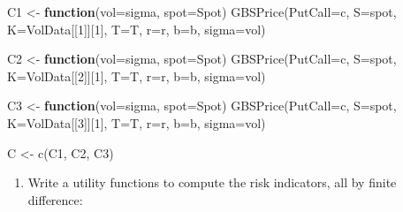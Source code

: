 \documentclass[
]{article}
\newenvironment{Shaded}{\begin{snugshade}}{\end{snugshade}}
\newcommand{\AttributeTok}[1]{\textcolor[rgb]{0.77,0.63,0.00}{#1}}
\newcommand{\ControlFlowTok}[1]{\textcolor[rgb]{0.13,0.29,0.53}{\textbf{#1}}}
\newcommand{\DecValTok}[1]{\textcolor[rgb]{0.00,0.00,0.81}{#1}}
\newcommand{\FunctionTok}[1]{\textcolor[rgb]{0.00,0.00,0.00}{#1}}
\newcommand{\NormalTok}[1]{#1}
\newcommand{\OtherTok}[1]{\textcolor[rgb]{0.56,0.35,0.01}{#1}}
\newcommand{\StringTok}[1]{\textcolor[rgb]{0.31,0.60,0.02}{#1}}
\providecommand{\tightlist}{%
  \setlength{\itemsep}{0pt}\setlength{\parskip}{0pt}}
\begin{document}
\begin{Shaded}
\begin{Highlighting}[]
\NormalTok{C1 }\OtherTok{\textless{}{-}} \ControlFlowTok{function}\NormalTok{(}\AttributeTok{vol=}\NormalTok{sigma, }\AttributeTok{spot=}\NormalTok{Spot) }\FunctionTok{GBSPrice}\NormalTok{(}\AttributeTok{PutCall=}\StringTok{\textquotesingle{}c\textquotesingle{}}\NormalTok{, }\AttributeTok{S=}\NormalTok{spot, }\AttributeTok{K=}\NormalTok{VolData[[}\DecValTok{1}\NormalTok{]][}\DecValTok{1}\NormalTok{], }\AttributeTok{T=}\NormalTok{T, }\AttributeTok{r=}\NormalTok{r, }\AttributeTok{b=}\NormalTok{b, }\AttributeTok{sigma=}\NormalTok{vol)}

\NormalTok{C2 }\OtherTok{\textless{}{-}} \ControlFlowTok{function}\NormalTok{(}\AttributeTok{vol=}\NormalTok{sigma, }\AttributeTok{spot=}\NormalTok{Spot) }\FunctionTok{GBSPrice}\NormalTok{(}\AttributeTok{PutCall=}\StringTok{\textquotesingle{}c\textquotesingle{}}\NormalTok{, }\AttributeTok{S=}\NormalTok{spot, }\AttributeTok{K=}\NormalTok{VolData[[}\DecValTok{2}\NormalTok{]][}\DecValTok{1}\NormalTok{], }\AttributeTok{T=}\NormalTok{T, }\AttributeTok{r=}\NormalTok{r, }\AttributeTok{b=}\NormalTok{b, }\AttributeTok{sigma=}\NormalTok{vol)}

\NormalTok{C3 }\OtherTok{\textless{}{-}} \ControlFlowTok{function}\NormalTok{(}\AttributeTok{vol=}\NormalTok{sigma, }\AttributeTok{spot=}\NormalTok{Spot) }\FunctionTok{GBSPrice}\NormalTok{(}\AttributeTok{PutCall=}\StringTok{\textquotesingle{}c\textquotesingle{}}\NormalTok{, }\AttributeTok{S=}\NormalTok{spot, }\AttributeTok{K=}\NormalTok{VolData[[}\DecValTok{3}\NormalTok{]][}\DecValTok{1}\NormalTok{], }\AttributeTok{T=}\NormalTok{T, }\AttributeTok{r=}\NormalTok{r, }\AttributeTok{b=}\NormalTok{b, }\AttributeTok{sigma=}\NormalTok{vol)}

\NormalTok{C }\OtherTok{\textless{}{-}} \FunctionTok{c}\NormalTok{(C1, C2, C3)}
\end{Highlighting}
\end{Shaded}

\begin{enumerate}
\def\labelenumi{\arabic{enumi}.}
\tightlist
\item
  Write a utility functions to compute the risk indicators, all by
  finite difference:
\end{enumerate}
\end{document}
